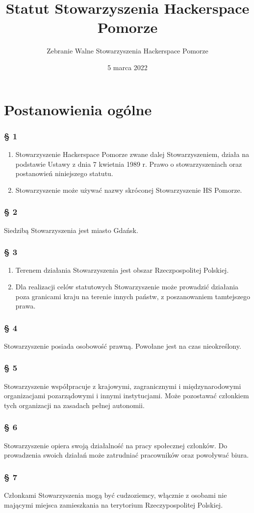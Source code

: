 \documentclass{article}
\title{Statut Stowarzyszenia Hackerspace Pomorze}
\author{Zebranie Walne Stowarzyszenia Hackerspace Pomorze}
\date{5 marca 2022}
\newcommand{\myparagraph}[1]{\subsubsection*{#1}}
\begin{document}
\maketitle

\section{Postanowienia ogólne}
\myparagraph{§ 1}
\begin{enumerate}
\item
  Stowarzyszenie Hackerspace Pomorze zwane dalej Stowarzyszeniem, działa na podstawie Ustawy z dnia 7 kwietnia 1989 r. Prawo o stowarzyszeniach oraz postanowień niniejszego statutu.
\item
  Stowarzyszenie może używać nazwy skróconej Stowarzyszenie HS Pomorze.
\end{enumerate}

\myparagraph{§ 2}
Siedzibą Stowarzyszenia jest miasto Gdańsk.

\myparagraph{§ 3}
\begin{enumerate}
\item
  Terenem działania Stowarzyszenia jest obszar Rzeczpospolitej Polskiej.
\item
  Dla realizacji celów statutowych Stowarzyszenie może prowadzić działania poza granicami kraju na terenie innych państw, z poszanowaniem tamtejszego prawa.
\end{enumerate}

\myparagraph{§ 4}
Stowarzyszenie posiada osobowość prawną. Powołane jest na czas nieokreślony.

\myparagraph{§ 5}
Stowarzyszenie współpracuje z krajowymi, zagranicznymi i międzynarodowymi organizacjami pozarządowymi i innymi instytucjami. Może pozostawać członkiem tych organizacji na zasadach pełnej autonomii.

\myparagraph{§ 6}
Stowarzyszenie opiera swoją działalność na pracy społecznej członków. Do prowadzenia swoich działań może zatrudniać pracowników oraz powoływać biura.

\myparagraph{§ 7}
Członkami Stowarzyszenia mogą być cudzoziemcy, włącznie z osobami nie mającymi miejsca zamieszkania na terytorium Rzeczypospolitej Polskiej.
\end{document}
